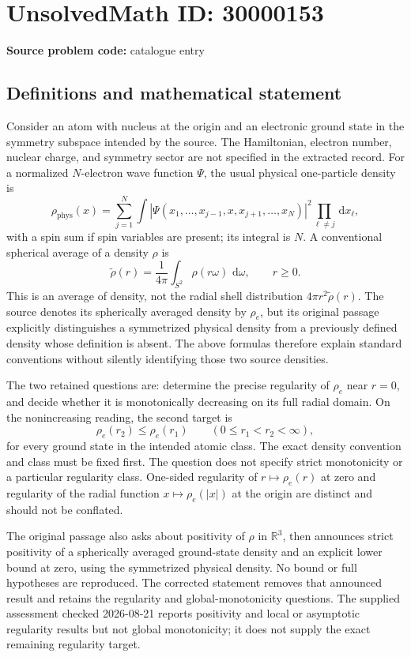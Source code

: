 \documentclass[11pt]{article}
\newcommand{\R}{\mathbb{R}}
\newcommand{\dd}{\,\mathrm{d}}
\begin{document}
\section*{UnsolvedMath ID: 30000153}
\textbf{Source problem code:} catalogue entry
\subsection{Definitions and mathematical statement}
Consider an atom with nucleus at the origin and an electronic ground state in the symmetry subspace intended by the source. The Hamiltonian, electron number, nuclear charge, and symmetry sector are not specified in the extracted record. For a normalized \(N\)-electron wave function \(\Psi\), the usual physical one-particle density is
\[
\rho_{\mathrm{phys}}(x)=\sum_{j=1}^N\int |\Psi(x_1,\ldots,x_{j-1},x,x_{j+1},\ldots,x_N)|^2\prod_{\ell\ne j}\dd x_\ell,
\]
with a spin sum if spin variables are present; its integral is \(N\). A conventional spherical average of a density \(\rho\) is
\[
\widetilde\rho(r)=\frac1{4\pi}\int_{S^2}\rho(r\omega)\,\dd\omega,\qquad r\geq0.
\]
This is an average of density, not the radial shell distribution \(4\pi r^2\widetilde\rho(r)\). The source denotes its spherically averaged density by \(\rho_e\), but its original passage explicitly distinguishes a symmetrized physical density from a previously defined density whose definition is absent. The above formulas therefore explain standard conventions without silently identifying those two source densities.

The two retained questions are: determine the precise regularity of \(\rho_e\) near \(r=0\), and decide whether it is monotonically decreasing on its full radial domain. On the nonincreasing reading, the second target is
\[
\rho_e(r_2)\leq\rho_e(r_1)\qquad(0\leq r_1<r_2<\infty),
\]
for every ground state in the intended atomic class. The exact density convention and class must be fixed first. The question does not specify strict monotonicity or a particular regularity class. One-sided regularity of \(r\mapsto\rho_e(r)\) at zero and regularity of the radial function \(x\mapsto\rho_e(|x|)\) at the origin are distinct and should not be conflated.

The original passage also asks about positivity of \(\rho\) in \(\R^3\), then announces strict positivity of a spherically averaged ground-state density and an explicit lower bound at zero, using the symmetrized physical density. No bound or full hypotheses are reproduced. The corrected statement removes that announced result and retains the regularity and global-monotonicity questions. The supplied assessment checked 2026-08-21 reports positivity and local or asymptotic regularity results but not global monotonicity; it does not supply the exact remaining regularity target.
\end{document}
